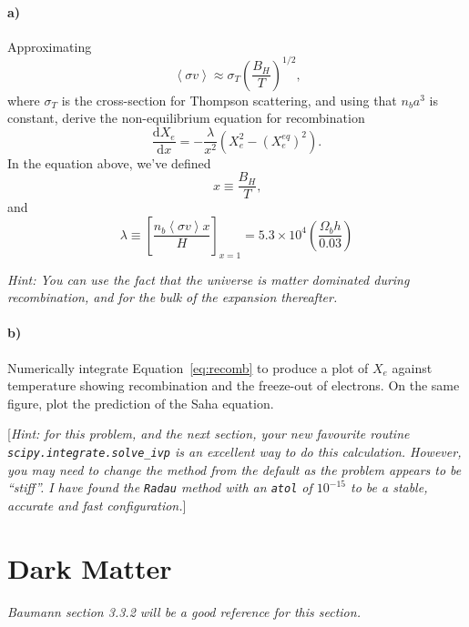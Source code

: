 \documentclass[12pt]{article}
\newcommand\diff{\mathrm{d}}
\begin{document}
\paragraph{a)} Approximating
\begin{equation}
    \left<\sigma v\right> \approx \sigma_T \left(\frac{B_H}{T}\right)^{1/2} \text{,}
\end{equation}
where $\sigma_T$ is the cross-section for Thompson scattering, and using that
$n_b a^3$ is constant, derive the non-equilibrium equation for recombination
\begin{equation}
    \frac{\diff X_e}{\diff x} = -\frac{\lambda}{x^2}
    \left(X_e^2 - (X_e^{eq})^2\right) \text{.}
    \label{eq:recomb}
\end{equation}
In the equation above, we've defined
\begin{equation}
    x \equiv \frac{B_H}{T} \text{,}
\end{equation}
and
\begin{equation}
    \lambda \equiv \left[\frac{n_b\left<\sigma v\right> x}{H}\right]_{x=1}
    = 5.3 \times 10^4 \left(\frac{\Omega_b h}{0.03}\right)
\end{equation}

\emph{Hint: You can use the fact that the universe is matter dominated during recombination, and for the bulk of the expansion thereafter.}

\paragraph{b)} Numerically integrate Equation~\ref{eq:recomb} to produce a plot
of $X_e$ against temperature showing recombination and the freeze-out of
electrons. On the same figure, plot the prediction of the Saha equation.

[\emph{Hint: for this problem, and the next section, your new favourite routine \texttt{scipy.integrate.solve\_ivp} is an excellent way to do this calculation. However, you may need to change the method from the default as the problem appears to be ``stiff''. I have found the \texttt{Radau} method with an \texttt{atol} of $10^{-15}$ to be a stable, accurate and fast configuration.}]


\section{Dark Matter}

\emph{Baumann section 3.3.2 will be a good reference for this section.}
\newcommand{\sigv}{\langle \sigma v \rangle}
\end{document}
